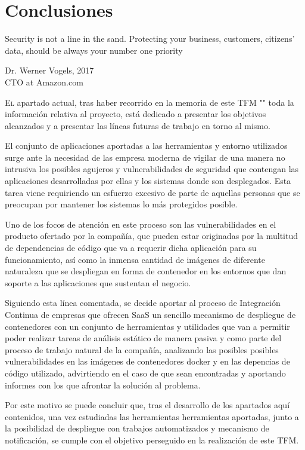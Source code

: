 \chapter{Conclusiones}\label{chp-05}
\epigraph{Security is not a line in the sand. Protecting your business, customers, citizens’ data, should be always your number one priority}{Dr. Werner Vogels, 2017\\CTO at Amazon.com}

\lettrine[lraise=-0.1, lines=2, loversize=0.2]{E}{l} apartado actual, tras haber recorrido en la memoria de este \gls{TFM} "\eltitulo" toda la información relativa al proyecto, está dedicado a presentar los objetivos alcanzados y a presentar las líneas futuras de trabajo en torno al mismo. 

El conjunto de aplicaciones aportadas a las herramientas y entorno utilizados surge ante la necesidad de las empresa moderna de vigilar de una manera no intrusiva los posibles agujeros y vulnerabilidades de seguridad que contengan las aplicaciones desarrolladas por ellas y los sistemas donde son desplegados. Esta tarea viene requiriendo un esfuerzo excesivo de parte de aquellas personas que se preocupan por mantener los sistemas lo más protegidos posible. 

Uno de los focos de atención en este proceso son las vulnerabilidades en el producto ofertado por la compañía, que pueden estar originadas por la multitud de dependencias de código que va a requerir dicha aplicación para su funcionamiento, así como la inmensa cantidad de imágenes de diferente naturaleza que se despliegan en forma de contenedor en los entornos que dan soporte a las aplicaciones que sustentan el negocio.

Siguiendo esta línea comentada, se decide aportar al proceso de Integración Continua de empresas que ofrecen \gls{SaaS} un sencillo mecanismo de despliegue de contenedores con un conjunto de herramientas y utilidades que van a permitir poder realizar tareas de análisis estático de manera pasiva y como parte del proceso de trabajo natural de la compañía, analizando las posibles posibles vulnerabilidades en las imágenes de contenedores docker y en las depencias  de código utilizado, advirtiendo en el caso de que sean encontradas y aportando informes con los que afrontar la solución al problema.

Por este motivo se puede concluir que, tras el desarrollo de los apartados aquí contenidos, una vez estudiadas las herramientas herramientas aportadas, junto a la posibilidad de despliegue con trabajos automatizados y mecanismo de notificación, se cumple con el objetivo perseguido en la realización de este \gls{TFM}.

